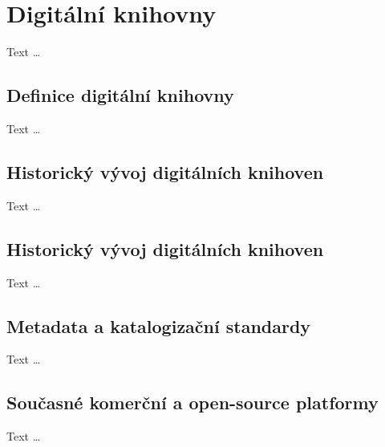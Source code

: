 
\section{Digitální knihovny}
Text \dots


\subsection{Definice digitální knihovny}
Text \dots


\subsection{Historický vývoj digitálních knihoven}
Text \dots


\subsection{Historický vývoj digitálních knihoven}
Text \dots


\subsection{Metadata a katalogizační standardy}
Text \dots


\subsection{Současné komerční a open-source platformy}
Text \dots


